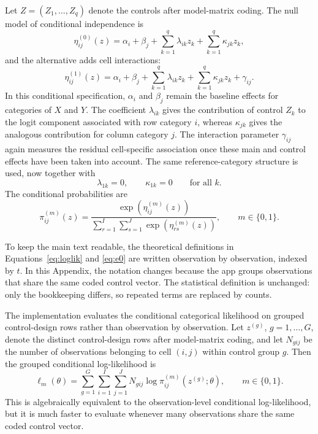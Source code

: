 \documentclass[11pt]{article}
\begin{document}
\begin{appendix}
Let $Z = (Z_1, \dots, Z_q)$ denote the controls after model-matrix coding. The
null model of conditional independence is
\begin{equation}
\eta^{(0)}_{ij}(z)
=
\alpha_i + \beta_j
+ \sum_{k=1}^{q} \lambda_{ik} z_k
+ \sum_{k=1}^{q} \kappa_{jk} z_k,
\label{eq:app-eta0-cond}
\end{equation}
and the alternative adds cell interactions:
\begin{equation}
\eta^{(1)}_{ij}(z)
=
\alpha_i + \beta_j
+ \sum_{k=1}^{q} \lambda_{ik} z_k
+ \sum_{k=1}^{q} \kappa_{jk} z_k
+ \gamma_{ij}.
\label{eq:app-eta1-cond}
\end{equation}
In this conditional specification, $\alpha_i$ and $\beta_j$ remain the
baseline effects for categories of $X$ and $Y$. The coefficient
$\lambda_{ik}$ gives the contribution of control $Z_k$ to the logit component
associated with row category $i$, whereas $\kappa_{jk}$ gives the analogous
contribution for column category $j$. The interaction parameter $\gamma_{ij}$
again measures the residual cell-specific association once these main and
control effects have been taken into account.
The same reference-category structure is used, now together with
\begin{equation}
\lambda_{1k} = 0,
\qquad
\kappa_{1k} = 0
\qquad \text{for all } k.
\label{eq:app-cond-constraints}
\end{equation}
The conditional probabilities are
\begin{equation}
\pi^{(m)}_{ij}(z)
=
\frac{\exp(\eta^{(m)}_{ij}(z))}
{\sum_{r=1}^{I}\sum_{s=1}^{J}\exp(\eta^{(m)}_{rs}(z))},
\qquad m \in \{0,1\}.
\label{eq:app-pi-cond}
\end{equation}

To keep the main text readable, the theoretical definitions in
Equations~\eqref{eq:loglik} and \eqref{eq:e0} are written observation by
observation, indexed by $t$. In this Appendix, the notation changes because
the app groups observations that share the same coded control vector. The
statistical definition is unchanged: only the bookkeeping differs, so repeated
terms are replaced by counts.

The implementation evaluates the conditional categorical likelihood on
grouped control-design rows rather than observation by observation. Let
$z^{(g)}$, $g = 1, \dots, G$, denote the distinct control-design rows after
model-matrix coding, and let $N_{gij}$ be the number of observations belonging
to cell $(i,j)$ within control group $g$. Then the grouped conditional
log-likelihood is
\begin{equation}
\ell_m(\theta) =
\sum_{g=1}^{G}\sum_{i=1}^{I}\sum_{j=1}^{J}
N_{gij}\log \pi^{(m)}_{ij}(z^{(g)}; \theta),
\qquad m \in \{0,1\}.
\label{eq:grouploglik}
\end{equation}
This is algebraically equivalent to the observation-level conditional
log-likelihood, but it is much faster to evaluate whenever many observations
share the same coded control vector.


\end{appendix}
\end{document}
